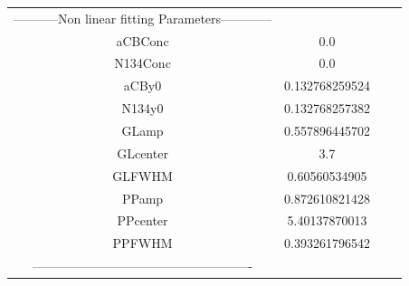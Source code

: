 \documentclass{article}
\begin{document}
\begin{tabular}{c c c c}

-----------Non linear fitting Parameters------------\\
aCBConc    &0.0\\
N134Conc   &0.0\\
aCBy0      &0.132768259524\\
N134y0     &0.132768257382\\
GLamp      &0.557896445702\\
GLcenter   &3.7\\
GLFWHM     &0.60560534905\\
PPamp      &0.872610821428\\
PPcenter   &5.40137870013\\
PPFWHM     &0.393261796542\\
----------------------------------------------------\\


\end{tabular}
\end{document}
